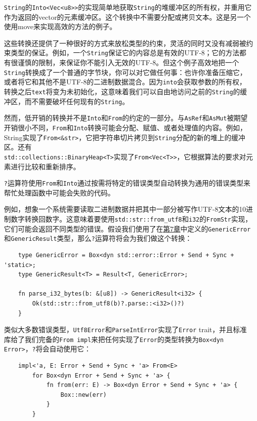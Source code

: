 \texttt{String}的\texttt{Into<Vec<u8>>}的实现简单地获取\texttt{String}的堆缓冲区的所有权，并重用它作为返回的vector的元素缓冲区。这个转换中不需要分配或拷贝文本。这是另一个使用move来实现高效的方法的例子。

这些转换还提供了一种很好的方式来放松类型的约束，灵活的同时又没有减弱被约束类型的保证。例如，一个\texttt{String}保证它的内容总是有效的UTF-8；它的方法都有很谨慎的限制，来保证你不能引入无效的UTF-8。但这个例子高效地把一个\texttt{String}转换成了一个普通的字节块，你可以对它做任何事：也许你准备压缩它，或者将它和其他不是UTF-8的二进制数据混合。因为\texttt{into}会获取参数的所有权，转换之后\texttt{text}将变为未初始化，这意味着我们可以自由地访问之前的\texttt{String}的缓冲区，而不需要破坏任何现有的\texttt{String}。

然而，低开销的转换并不是\texttt{Into}和\texttt{From}的约定的一部分。与\texttt{AsRef}和\texttt{AsMut}被期望开销很小不同，\texttt{From}和\texttt{Into}转换可能会分配、赋值、或者处理值的内容。例如，String实现了\texttt{From<\&str>}，它把字符串切片拷贝到\texttt{String}分配的新的堆上的缓冲区。还有\\
\texttt{std::collections::BinaryHeap<T>}实现了\texttt{From<Vec<T>>}，它根据算法的要求对元素进行比较和重新排序。

\texttt{?}运算符使用\texttt{From}和\texttt{Into}通过按需将特定的错误类型自动转换为通用的错误类型来帮忙处理函数中可能会失败的代码。

例如，想象一个系统需要读取二进制数据并把其中一部分被写作UTF-8文本的10进制数字转换回数字。这意味着要使用\texttt{std::str::from\_utf8}和\texttt{i32}的\texttt{FromStr}实现，它们可能会返回不同类型的错误。假设我们使用了在\hyperref[ch07]{第7章}中定义的\texttt{GenericError}和\texttt{GenericResult}类型，那么\texttt{?}运算符将会为我们做这个转换：
\begin{verbatim}
    type GenericError = Box<dyn std::error::Error + Send + Sync + 'static>;
    type GenericResult<T> = Result<T, GenericError>;

    fn parse_i32_bytes(b: &[u8]) -> GenericResult<i32> {
        Ok(std::str::from_utf8(b)?.parse::<i32>()?)
    }
\end{verbatim}

类似大多数错误类型，\texttt{Utf8Error}和\texttt{ParseIntError}实现了\texttt{Error} trait，并且标准库给了我们完备的\texttt{From impl}来把任何实现了\texttt{Error}的类型转换为\texttt{Box<dyn Error>}，\texttt{?}将会自动使用它：
\begin{verbatim}
    impl<'a, E: Error + Send + Sync + 'a> From<E>
        for Box<dyn Error + Send + Sync + 'a> {
            fn from(err: E) -> Box<dyn Error + Send + Sync + 'a> {
                Box::new(err)
            }
        }
\end{verbatim}

